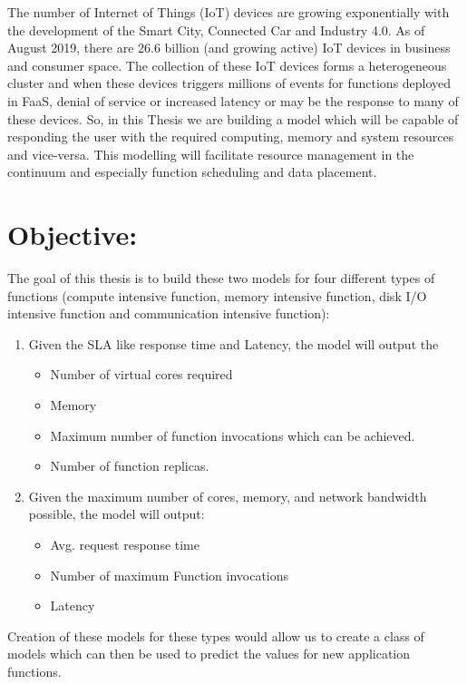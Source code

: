 The number of Internet of Things (IoT) devices are growing exponentially with the development of the Smart City, Connected Car and Industry 4.0. 
As of August 2019, there are 26.6 billion (and growing active) IoT devices in business and consumer space.
The collection of these IoT devices forms a heterogeneous cluster and when these devices triggers millions of events for functions deployed in FaaS, denial of service or increased latency or may be the response to many of these devices.
So, in this Thesis we are building a model which will be capable of responding the user with the required computing, memory and system resources and vice-versa.
This modelling will facilitate resource management in the continuum and especially function scheduling and data placement.

\newpage 

\section{Objective:}

The goal of this thesis is to build these two models for four different types of functions (compute intensive function, memory intensive function, disk I/O intensive function and communication intensive function): 
\begin{enumerate}
\item Given the SLA like response time and Latency, the model will output the
\begin{itemize}
    \item Number of virtual cores required
    \item Memory
    \item Maximum number of function invocations which can be achieved.
    \item Number of function replicas.
\end{itemize}
\item Given the maximum number of cores, memory, and network bandwidth possible, the model will output: 
\begin{itemize}
    \item Avg. request response time
    \item Number of maximum Function invocations
    \item Latency
\end{itemize}
\end{enumerate}
Creation of these models for these types would allow us to create a class of models which can then be used to predict the values for new application functions. 


